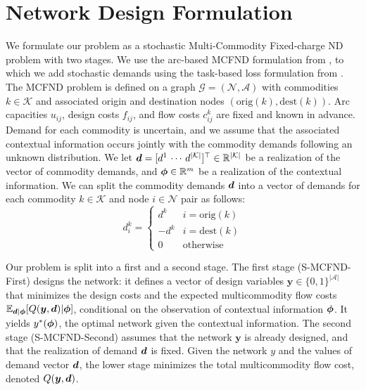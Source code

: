 
\section{Network Design Formulation} \label{sec:methodology:opti-problem}

We formulate our problem as a stochastic Multi-Commodity Fixed-charge ND problem with two stages. We use the arc-based MCFND formulation from \cite{crainicNetworkDesignApplications2021}, to which we add stochastic demands using the task-based loss formulation from \cite{dontiTaskbasedEndtoendModel2017}. The MCFND problem is defined on a graph $\mathcal{G} = (\mathcal{N}, \mathcal{A})$ with commodities $k \in \mathcal{K}$ and associated origin and destination nodes $(\text{orig}(k), \text{dest}(k))$. Arc capacities ${u_{ij}}$, design costs ${f_{ij}}$, and flow costs ${c_{ij}^k}$ are fixed and known in advance. Demand for each commodity is uncertain, and we assume that the associated contextual information occurs jointly with the commodity demands following an unknown distribution. We let ${\bm{d}} = [d^1 \,\cdots\, d^{|\mathcal{K}|}]^\top \in \mathbb{R}^{|\mathcal{K}|}$ be a realization of the vector of commodity demands, and ${\bm{\phi}} \in \mathbb{R}^m$ be a realization of the contextual information. We can split the commodity demands ${\bm{d}}$ into a vector of demands for each commodity $k \in \mathcal{K}$ and node $i \in \mathcal{N}$ pair as follows:
\begin{equation} \label{eq:methodology:demand-by-node}
    d^k_i = \begin{cases}
        d^k & i = \text{orig}(k)\\
        -d^k & i = \text{dest}(k) \\
        0 & \text{otherwise}
    \end{cases}
\end{equation}
    
Our problem is split into a first and a second stage. The first stage (S-MCFND-First) designs the network: it defines a vector of design variables $\bm{y} \in \{0, 1\}^{|\mathcal{A}|}$ that minimizes the design costs and the expected multicommodity flow costs $\mathbb{E}_{{\bm{d}} | {\bm{\phi}}}[Q(\bm{y}, {\bm{d}}) | {\bm{\phi}}]$, conditional on the observation of contextual information ${\bm{\phi}}$. It yields $y^*({\bm{\phi}})$, the optimal network given the contextual information. The second stage (S-MCFND-Second) assumes that the network $\bm{y}$ is already designed, and that the realization of demand ${\bm{d}}$ is fixed. Given the network $y$ and the values of demand vector ${\bm{d}}$, the lower stage minimizes the total multicommodity flow cost, denoted $Q(\bm{y}, {\bm{d}})$. 

